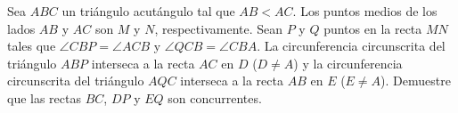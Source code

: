 Sea $ABC$ un triángulo acutángulo tal que $AB < AC$. Los puntos medios de los lados $AB$ y $AC$ son $M$ y $N$, respectivamente. Sean $P$ y $Q$ puntos en la recta $MN$ tales que $\angle CBP = \angle ACB$ y $\angle QCB = \angle CBA$. La circunferencia circunscrita del triángulo $ABP$ interseca a la recta $AC$ en $D$ ($D \neq A$) y la circunferencia circunscrita del triángulo $AQC$ interseca a la recta $AB$ en $E$ ($E \neq A$). Demuestre que las rectas $BC$, $DP$ y $EQ$ son concurrentes.
